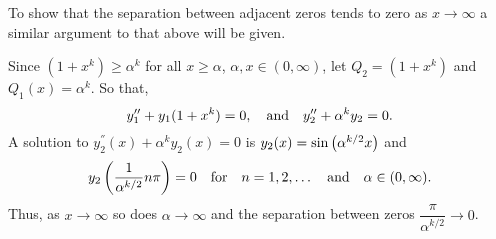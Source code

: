 \begin{question}
To show that the separation between adjacent zeros tends to zero as $x\rightarrow\infty$ a similar argument to that above will be given.

Since $(1+x^k) \geq \alpha^k$ for all $x\geq \alpha$,\;\; $\alpha,x \in (0,\infty)$,\;\; let $Q_2 = (1+x^k)$ and $Q_1(x) = \alpha^k$. So that,
\[
	y_1^{\prime\prime} + y_1(1+x^k) = 0,\quad\text{and}\quad y_2^{\prime\prime} + \alpha^k y_2 = 0.
\]
A solution to $y_2^\dprime(x) + \alpha^k y_2(x) = 0$ is $y_2(x)=\sin\left(\alpha^{k/2} x\right)$ and 
\[
	y_2\left(\frac{1}{\alpha^{k/2}} n\pi\right) = 0\quad\text{for}\quad n=1,2,\ldots\quad\text{and}\quad \alpha \in (0,\infty).
\]
Thus, as $x\rightarrow \infty$ so does $\alpha \rightarrow \infty$ and the separation between zeros $\dfrac{\pi}{\alpha^{k/2}} \rightarrow 0$.
\end{question}
